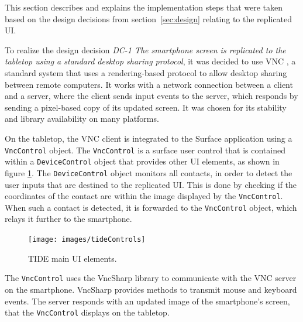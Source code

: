 
This section describes and explains the implementation steps that were taken based on the design decisions from section~\ref{sec:design} relating to the replicated UI.

To realize the design decision
\emph{DC-1 The smartphone screen is replicated to the tabletop using a standard desktop sharing protocol}, 
it was decided to use VNC \citep{Richardson:1998:vnc}, a standard system that uses a rendering-based protocol to allow desktop sharing between remote computers.
It works with a network connection between a client and a server, where the client sends input events to the server, which responds by sending a pixel-based copy of its updated screen.
It was chosen for its stability and library availability on many platforms.


On the tabletop, the VNC client is integrated to the Surface application using a \texttt{VncControl} object.
The \texttt{VncControl} is a surface user control that is contained within a \texttt{DeviceControl} object that provides other UI elements, as shown in figure \ref{fig:tideControls}.
The \texttt{DeviceControl} object monitors all contacts, in order to detect the user inputs that are destined to the replicated UI.
This is done by checking if the coordinates of the contact are within the image displayed by the \texttt{VncControl}.
When such a contact is detected, it is forwarded to the \texttt{VncControl} object, which relays it further to the smartphone.

\begin{figure}[htb]
  \centering
    \texttt{[image: images/tideControls]}
    \caption{TIDE main UI elements.}
    \label{fig:tideControls}
\end{figure}

The \texttt{VncControl} uses the VncSharp library \citep{vncsharp} to communicate with the VNC server on the smartphone.
VncSharp provides methods to transmit mouse and keyboard events.
The server responds with an updated image of the smartphone's screen, that the \texttt{VncControl} displays on the tabletop.

